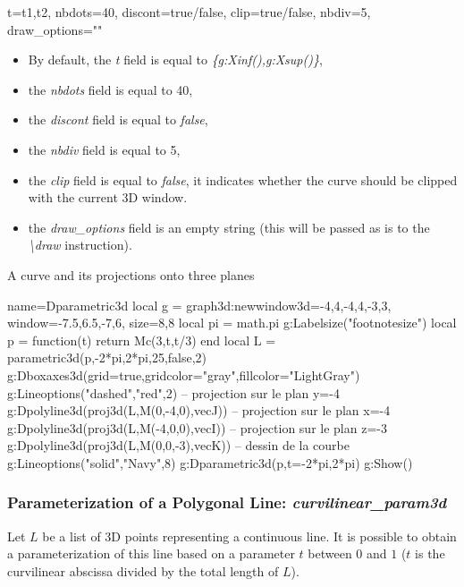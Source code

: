 \begin{itemize}
\begin{TeXcode}
{ t={t1,t2}, nbdots=40, discont=true/false, clip=true/false, nbdiv=5, draw_options="" }
\end{TeXcode}

\begin{itemize}
    \item By default, the \emph{t} field is equal to \emph{\{g:Xinf(),g:Xsup()\}},
    \item the \emph{nbdots} field is equal to 40,
    \item the \emph{discont} field is equal to \emph{false},
    \item the \emph{nbdiv} field is equal to 5,
    \item the \emph{clip} field is equal to \emph{false}, it indicates whether the curve should be clipped with the current 3D window.     \item the \emph{draw\_options} field is an empty string (this will be passed as is to the \emph{\textbackslash draw} instruction).
\end{itemize}
\end{itemize}

\begin{demo}{A curve and its projections onto three planes}
\begin{luadraw}{name=Dparametric3d}
local g = graph3d:new{window3d={-4,4,-4,4,-3,3}, window={-7.5,6.5,-7,6}, size={8,8}}
local pi = math.pi
g:Labelsize("footnotesize")
local p = function(t) return Mc(3,t,t/3) end
local L = parametric3d(p,-2*pi,2*pi,25,false,2)
g:Dboxaxes3d({grid=true,gridcolor="gray",fillcolor="LightGray"})
g:Lineoptions("dashed","red",2)
-- projection sur le plan y=-4
g:Dpolyline3d(proj3d(L,{M(0,-4,0),vecJ}))
-- projection sur le plan x=-4
g:Dpolyline3d(proj3d(L,{M(-4,0,0),vecI}))
-- projection sur le plan z=-3
g:Dpolyline3d(proj3d(L,{M(0,0,-3),vecK}))
-- dessin de la courbe
g:Lineoptions("solid","Navy",8)
g:Dparametric3d(p,{t={-2*pi,2*pi}})
g:Show()
\end{luadraw}
\end{demo}

\subsubsection{Parameterization of a Polygonal Line: \emph{curvilinear\_param3d}}
Let $L$ be a list of 3D points representing a continuous \og \fg line. It is possible to obtain a parameterization of this line based on a parameter $t$ between $0$ and $1$ ($t$ is the curvilinear abscissa divided by the total length of $L$).

